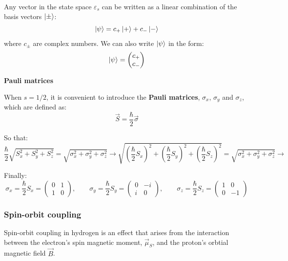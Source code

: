 Any vector in the state space $\varepsilon_s$ can be written as a linear combination of the basis vectors $\ket{\pm}$:
\begin{equation}
    \ket{\psi} = c_+\ket{+} + c_-\ket{-}
\end{equation}
where $c_\pm$ are complex numbers. We can also write $\ket{\psi}$ in the form:
\begin{equation}
    \ket{\psi} = \begin{pmatrix}
        c_+ \\
        c_-
    \end{pmatrix}
\end{equation}

\textbf{Pauli matrices}

When $s=1/2$, it is convenient to introduce the \textbf{Pauli matrices}, $\sigma_x$, $\sigma_y$ and $\sigma_z$, which are defined as:
\begin{equation}
    \vec{S} = \frac{\hbar}{2}\vec{\sigma}
\end{equation}

So that:
\begin{equation}
    \frac{\hbar}{2}\sqrt{S_x^2+S_y^2+S_z^2} = \sqrt{\sigma_x^2+\sigma_y^2+\sigma_z^2}\longrightarrow \sqrt{\left(\frac{\hbar}{2}S_x\right)^2+\left(\frac{\hbar}{2}S_y\right)^2+\left(\frac{\hbar}{2}S_z\right)^2} = \sqrt{\sigma_x^2+\sigma_y^2+\sigma_z^2}\to
\end{equation}

Finally:
\begin{equation}
    \sigma_x = \frac{\hbar}{2}S_x = \begin{pmatrix}
        0 & 1 \\
        1 & 0
    \end{pmatrix}, \qquad \sigma_y = \frac{\hbar}{2}S_y = \begin{pmatrix}
        0 & -i \\
        i & 0
    \end{pmatrix}, \qquad \sigma_z = \frac{\hbar}{2}S_z = \begin{pmatrix}
        1 & 0 \\
        0 & -1
    \end{pmatrix} 
\end{equation}

\subsubsection{Spin-orbit coupling}

Spin-orbit coupling in hydrogen is an effect that arises from the interaction between the electron's spin magnetic moment, $\vec{\mu}_S$, and the proton's orbtial magnetic field $\vec{B}$.

